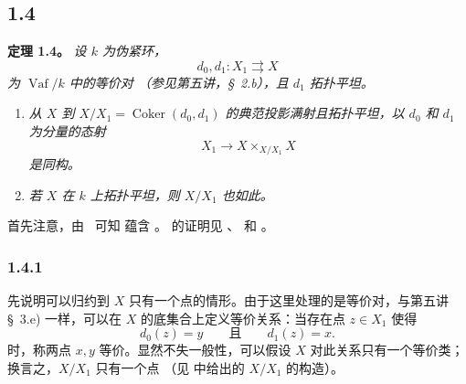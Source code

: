 \subsection*{1.4} \label{sga3:VIIB:1.4}

\noindent\textbf{定理 1.4。} \label{sga3:VIIB:1.4.thm} {\itshape 设 \(k\) 为伪紧环，\[
  d_0,d_1:X_1\rightrightarrows X
\] 为 \(\operatorname{Vaf}/k\) 中的等价对 \textup{（参见第五讲，\S~2.b）}，且 \(d_1\) 拓扑平坦。}\begin{enumerate}\item[\textup{(i)}]{\itshape 从 \(X\) 到 \(X/X_1=\operatorname{Coker}(d_0,d_1)\) 的典范投影满射且拓扑平坦，以 \(d_0\) 和 \(d_1\) 为分量的态射 \[
    X_1\longrightarrow X\times_{X/X_1}X
  \] 是同构。}

\item[\textup{(ii)}]{\itshape 若 \(X\) 在 \(k\) 上拓扑平坦，则 \(X/X_1\) 也如此。}\end{enumerate}

首先注意，由 \,\textup{} 可知 \textup{} 蕴含 \textup{}。\textup{} 的证明见 、 和 。

\subsubsection*{1.4.1}
\label{sga3:VIIB:1.4.1}

先说明可以归约到 \(X\) 只有一个点的情形。由于这里处理的是等价对，与第五讲 \S~3.e) 一样，可以在 \(X\) 的底集合上定义等价关系：当存在点 \(z\in X_1\) 使得 \[
  d_0(z)=y
  \qquad\text{且}\qquad
  d_1(z)=x.
\] 时，称两点 \(x,y\) 等价。显然不失一般性，可以假设 \(X\) 对此关系只有一个等价类；换言之，\(X/X_1\) 只有一个点 \textup{（见  中给出的 \(X/X_1\) 的构造）}。


